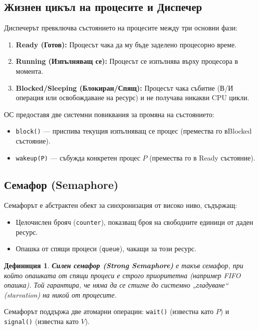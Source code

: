 \documentclass{scrartcl}
\newtheorem{definition}{Дефиниция}
\begin{document}
\begin{FlushLeft}
\subsection{Жизнен цикъл на процесите и Диспечер}
Диспечерът превключва състоянието на процесите между три основни фази:
\begin{enumerate}
    \item \textbf{Ready (Готов):} Процесът чака да му бъде заделено процесорно време.
    \item \textbf{Running (Изпълняващ се):} Процесът се изпълнява върху процесора в момента.
    \item \textbf{Blocked/Sleeping (Блокиран/Спящ):} Процесът чака събитие (В/И операция или освобождаване на ресурс) и не получава никакви CPU цикли.
\end{enumerate}

ОС предоставя две системни повиквания за промяна на състоянието:
\begin{itemize}
    \item \lstinline|block()| --- приспива текущия изпълняващ се процес (премества го вBlocked състояние).
    \item \lstinline|wakeup(P)| --- събужда конкретен процес $P$ (премества го в Ready състояние).
\end{itemize}

\subsection{Семафор (Semaphore)}
Семафорът е абстрактен обект за синхронизация от високо ниво, съдържащ:
\begin{itemize}
    \item Целочислен брояч (\lstinline|counter|), показващ броя на свободните единици от даден ресурс.
    \item Опашка от спящи процеси (\lstinline|queue|), чакащи за този ресурс.
\end{itemize}

\begin{definition}
\textbf{Силен семафор (Strong Semaphore)} е такъв семафор, при който опашката от спящи процеси е строго приоритетна (например FIFO опашка). Той гарантира, че няма да се стигне до системно „гладуване“ (starvation) на никой от процесите.
\end{definition}

Семафорът поддържа две атомарни операции: \lstinline|wait()| (известна като $P$) и \lstinline|signal()| (известна като $V$).


\end{FlushLeft}
\end{document}
